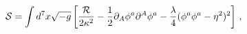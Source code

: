 \begin{equation}
{\cal S} = \int d^7x \sqrt{-g}\left[
{{\cal R} \over  2\kappa^2} 
-{1\over 2}\partial_A\phi^a\partial^A\phi^a
-{\lambda\over 4}(\phi^a\phi^a-\eta^2)^2
\right]\,,
\label{eq=action}
\end{equation}

